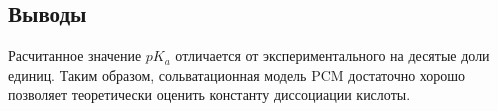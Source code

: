 \subsection{Выводы}
Расчитанное значение $pK_a$ отличается от экспериментального на десятые доли единиц. Таким образом, сольватационная модель PCM достаточно хорошо позволяет теоретически оценить константу диссоциации кислоты. 